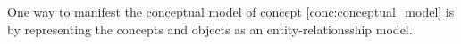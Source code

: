 \begin{tool} \label{tool:conceptual_model} 
  One way to manifest the conceptual model of concept \ref{conc:conceptual_model} is by representing the concepts and objects as an entity-relationsship model. \cite[p. 199-200]{benyon14}
\end{tool}

